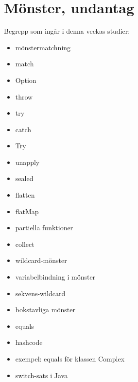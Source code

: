 \chapter{Mönster, undantag}\label{chapter:W06}
Begrepp som ingår i denna veckas studier:
\begin{itemize}[noitemsep,label={$\square$},leftmargin=*]
\item mönstermatchning
\item match
\item Option
\item throw
\item try
\item catch
\item Try
\item unapply
\item sealed
\item flatten
\item flatMap
\item partiella funktioner
\item collect
\item wildcard-mönster
\item variabelbindning i mönster
\item sekvens-wildcard
\item bokstavliga mönster
\item equals
\item hashcode
\item exempel: equals för klassen Complex
\item switch-sats i Java\end{itemize}

